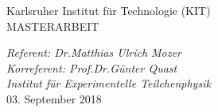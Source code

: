 \begin{titlepage}
\begin{addmargin}[1.5cm]{0cm}
\begin{center}
{  Karlsruher Institut f\"ur Technologie (KIT)\\
  \vspace{0.825 cm}
  \large{MASTERARBEIT}\\
  \vspace{0.825 cm}

  \large{\textit{Referent: Dr.\;Matthias Ulrich Mozer}}\\
  \large{\textit{Korreferent: Prof.\;Dr.\;G\"unter Quast}}\\
   \vspace{0.2 cm}
\large{\textit{Institut f\"ur Experimentelle Teilchenphysik}}\\


  \vspace{1.0cm}
  \large{03. September 2018}%
}
\end{center}
\end{addmargin}
\end{titlepage}
